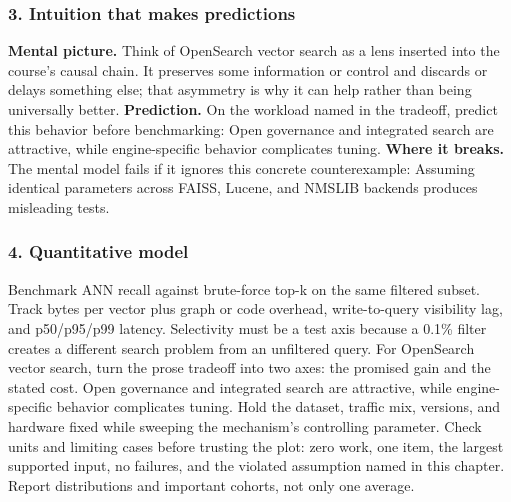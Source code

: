 \subsubsection*{3. Intuition that makes predictions}
\textbf{Mental picture.} Think of OpenSearch vector search as a lens inserted into the course's causal chain. It preserves some information or control and discards or delays something else; that asymmetry is why it can help rather than being universally better.
\textbf{Prediction.} On the workload named in the tradeoff, predict this behavior before benchmarking: Open governance and integrated search are attractive, while engine-specific behavior complicates tuning.
\textbf{Where it breaks.} The mental model fails if it ignores this concrete counterexample: Assuming identical parameters across FAISS, Lucene, and NMSLIB backends produces misleading tests.
\subsubsection*{4. Quantitative model}
Benchmark ANN recall against brute-force top-k on the same filtered subset. Track bytes per vector plus graph or code overhead, write-to-query visibility lag, and p50/p95/p99 latency. Selectivity must be a test axis because a 0.1\% filter creates a different search problem from an unfiltered query.
For OpenSearch vector search, turn the prose tradeoff into two axes: the promised gain and the stated cost. Open governance and integrated search are attractive, while engine-specific behavior complicates tuning. Hold the dataset, traffic mix, versions, and hardware fixed while sweeping the mechanism's controlling parameter.
Check units and limiting cases before trusting the plot: zero work, one item, the largest supported input, no failures, and the violated assumption named in this chapter. Report distributions and important cohorts, not only one average.

